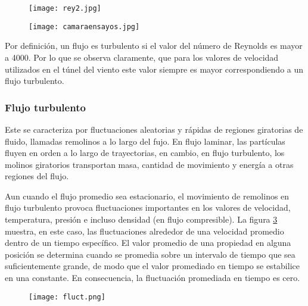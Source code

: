 \begin{figure}[htb]
	\centering
	\texttt{[image: rey2.jpg]}
	\label{fig:rey2}
\end{figure}


\begin{figure}[htb]
	\centering
	\texttt{[image: camaraensayos.jpg]}
	\label{fig:camens}
\end{figure}



Por definición, un flujo es turbulento si el valor del número de Reynolds es mayor a 4000. Por lo que se observa claramente, que para los valores de velocidad utilizados en el túnel del viento este valor siempre es mayor correspondiendo a un flujo turbulento.

\subsubsection{Flujo turbulento}
\begin{tcolorbox}[colback=blue!5!white,colframe=blue!75!black,title=Flujo turbulento]
	Este se caracteriza por fluctuaciones aleatorias y rápidas de regiones giratorias de fluido, llamadas remolinos a lo largo del fujo. En flujo laminar, las partículas fluyen en orden a lo largo de trayectorias, en cambio, en flujo turbulento, los molinos giratorios transportan masa, cantidad de movimiento y energía a otras regiones del flujo. \cite{yunus2006mecanica}
	
\end{tcolorbox}

Aun cuando el flujo promedio sea estacionario, el movimiento de remolinos en flujo turbulento provoca fluctuaciones importantes en los valores de velocidad, temperatura, presión e incluso densidad (en flujo compresible). La figura \ref{fig:fluct} muestra, en este caso, las fluctuaciones alrededor de una velocidad promedio dentro de un tiempo específico. El valor promedio de una propiedad en alguna posición se determina cuando se promedia sobre un intervalo de tiempo que sea suficientemente grande, de modo que el valor promediado en tiempo se estabilice en una constante. En consecuencia, la fluctuación promediada en tiempo es cero.

\begin{figure}[htb]
	\centering
	\texttt{[image: fluct.png]}
	\label{fig:fluct}
\end{figure}

